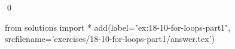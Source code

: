 
\begin{ex}
  \label{ex:18-10-for-loops-part1}
  
  \qed
\end{ex}
\begin{python0}
from solutions import *
add(label="ex:18-10-for-loops-part1",
    srcfilename='exercises/18-10-for-loops-part1/answer.tex')
\end{python0}
